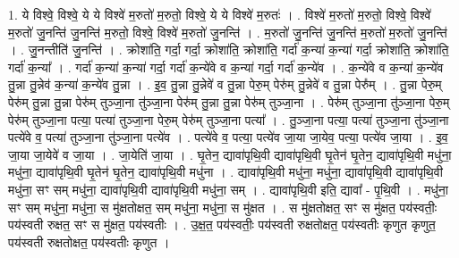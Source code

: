 \documentclass[17pt]{extarticle}
\begin{document}
1. ये विश्वे॒ विश्वे॒ ये ये विश्वे॑ म॒रुतो॑ म॒रुतो॒ विश्वे॒ ये ये विश्वे॑ म॒रुतः॑ । . विश्वे॑ म॒रुतो॑ म॒रुतो॒ विश्वे॒ विश्वे॑ म॒रुतो॑ जु॒नन्ति॑ जु॒नन्ति॑ म॒रुतो॒ विश्वे॒ विश्वे॑ म॒रुतो॑ जु॒नन्ति॑ । . म॒रुतो॑ जु॒नन्ति॑ जु॒नन्ति॑ म॒रुतो॑ म॒रुतो॑ जु॒नन्ति॑ । . जु॒नन्तीति॑ जु॒नन्ति॑ । . क्रोशा॑ति॒ गर्दा॒ गर्दा॒ क्रोशा॑ति॒ क्रोशा॑ति॒ गर्दा॑ क॒न्या॑ क॒न्या॑ गर्दा॒ क्रोशा॑ति॒ क्रोशा॑ति॒ गर्दा॑ क॒न्या᳚ । . गर्दा॑ क॒न्या॑ क॒न्या॑ गर्दा॒ गर्दा॑ क॒न्ये॑वे व क॒न्या॑ गर्दा॒ गर्दा॑ क॒न्ये॑व । . क॒न्ये॑वे व क॒न्या॑ क॒न्ये॑व तु॒न्ना तु॒न्नेव॑ क॒न्या॑ क॒न्ये॑व तु॒न्ना । . इ॒व॒ तु॒न्ना तु॒न्नेवे॑ व तु॒न्ना पेरु॒म् पेरु॑म् तु॒न्नेवे॑ व तु॒न्ना पेरु᳚म् । . तु॒न्ना पेरु॒म् पेरु॑म् तु॒न्ना तु॒न्ना पेरु॑म् तुञ्जा॒ना तु॑ञ्जा॒ना पेरु॑म् तु॒न्ना तु॒न्ना पेरु॑म् तुञ्जा॒ना । . पेरु॑म् तुञ्जा॒ना तु॑ञ्जा॒ना पेरु॒म् पेरु॑म् तुञ्जा॒ना पत्या॒ पत्या॑ तुञ्जा॒ना पेरु॒म् पेरु॑म् तुञ्जा॒ना पत्या᳚ । . तु॒ञ्जा॒ना पत्या॒ पत्या॑ तुञ्जा॒ना तु॑ञ्जा॒ना पत्ये॑वे व॒ पत्या॑ तुञ्जा॒ना तु॑ञ्जा॒ना पत्ये॑व । . पत्ये॑वे व॒ पत्या॒ पत्ये॑व जा॒या जा॒येव॒ पत्या॒ पत्ये॑व जा॒या । . इ॒व॒ जा॒या जा॒येवे॑ व जा॒या । . जा॒येति॑ जा॒या । . घृ॒तेन॒ द्यावा॑पृथि॒वी द्यावा॑पृथि॒वी घृ॒तेन॑ घृ॒तेन॒ द्यावा॑पृथि॒वी मधु॑ना॒ मधु॑ना॒ द्यावा॑पृथि॒वी घृ॒तेन॑ घृ॒तेन॒ द्यावा॑पृथि॒वी मधु॑ना । . द्यावा॑पृथि॒वी मधु॑ना॒ मधु॑ना॒ द्यावा॑पृथि॒वी द्यावा॑पृथि॒वी मधु॑ना॒ सꣳ सम् मधु॑ना॒ द्यावा॑पृथि॒वी द्यावा॑पृथि॒वी मधु॑ना॒ सम् । . द्यावा॑पृथि॒वी इति॒ द्यावा᳚ - पृ॒थि॒वी । . मधु॑ना॒ सꣳ सम् मधु॑ना॒ मधु॑ना॒ स मु॑क्षतोक्षत॒ सम् मधु॑ना॒ मधु॑ना॒ स मु॑क्षत । . स मु॑क्षतोक्षत॒ सꣳ स मु॑क्षत॒ पय॑स्वतीः॒ पय॑स्वती रुक्षत॒ सꣳ स मु॑क्षत॒ पय॑स्वतीः । . उ॒क्ष॒त॒ पय॑स्वतीः॒ पय॑स्वती रुक्षतोक्षत॒ पय॑स्वतीः कृणुत कृणुत॒ पय॑स्वती रुक्षतोक्षत॒ पय॑स्वतीः कृणुत । \newline
\end{document}
